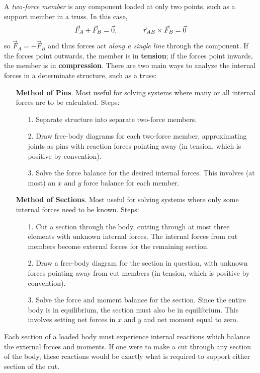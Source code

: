 A \textit{two-force member} is any component loaded at only two points, such as a support member in a truss. In this case, \[\vec{F}_A + \vec{F}_B = \vec{0},\hspace{0.5in} \vec{r}_{AB}\times \vec{F}_B = \vec{0}\] so $\vec{F}_A = -\vec{F}_B$ and thus forces act \textit{along a single line} through the component. If the forces point outwards, the member is in \textbf{tension}; if the forces point inwards, the member is in \textbf{compression}.
\newpage
There are two main ways to analyze the internal forces in a determinate structure, such as a truss:
\begin{enumerate}
    \item[] \textbf{Method of Pins}. Most useful for solving systems where many or all internal forces are to be calculated. Steps: \begin{enumerate}
        \item[1.] Separate structure into separate two-force members.
        \item[2.] Draw free-body diagrams for each two-force member, approximating joints as pins with reaction forces pointing away (in tension, which is positive by convention).
        \item[3.] Solve the force balance for the desired internal forces. This involves (at most) an $x$ and $y$ force balance for each member.
    \end{enumerate}
    \item[] \textbf{Method of Sections}. Most useful for solving systems where only some internal forces need to be known. Steps:
    \begin{enumerate}
        \item[1.] Cut a section through the body, cutting through at most three elements with unknown internal forces. The internal forces from cut members become external forces for the remaining section.
        \item[2.] Draw a free-body diagram for the section in question, with unknown forces pointing away from cut members (in tension, which is positive by convention).
        \item[3.] Solve the force and moment balance for the section. Since the entire body is in equilibrium, the section must also be in equilibrium. This involves setting net forces in $x$ and $y$ and net moment equal to zero.
    \end{enumerate}
\end{enumerate}

Each section of a loaded body must experience internal reactions which balance the external forces and moments. If one were to make a cut through any section of the body, these reactions would be exactly what is required to support either section of the cut.

